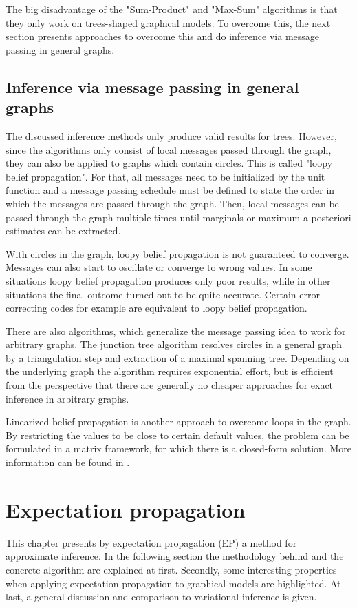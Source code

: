 \documentclass{sigkdd}
\begin{document}
The big disadvantage of the "Sum-Product" and "Max-Sum" algorithms is that they only work on trees-shaped graphical models. To overcome this, the next section presents approaches to overcome this and do inference via message passing in general graphs.

\subsection{Inference via message passing in general graphs}
The discussed inference methods only produce valid results for trees. However, since the algorithms only consist of local messages passed through the graph, they can also be applied to graphs which contain circles. This is called "loopy belief propagation". For that, all messages need to be initialized by the unit function and a message passing schedule must be defined to state the order in which the messages are passed through the graph. Then, local messages can be passed through the graph multiple times until marginals or maximum a posteriori estimates can be extracted.

With circles in the graph, loopy belief propagation is not guaranteed to converge. Messages can also start to oscillate or converge to wrong values. In some situations loopy belief propagation produces only poor results, while in other situations the final outcome turned out to be quite accurate. Certain error-correcting codes for example are equivalent to loopy belief propagation.

There are also algorithms, which generalize the message passing idea to work for arbitrary graphs. The junction tree algorithm resolves circles in a general graph by a triangulation step and extraction of a maximal spanning tree. Depending on the underlying graph the algorithm requires exponential effort, but is efficient from the perspective that there are generally no cheaper approaches for exact inference in arbitrary graphs.

Linearized belief propagation is another approach to overcome loops in the graph. By restricting the values to be close to certain default values, the problem can be formulated in a matrix framework, for which there is a closed-form solution. More information can be found in \cite{Gatterbauer:2015:LSB:2735479.2735490}. 

\section{Expectation propagation}\label{chapter:approximate_inference}
This chapter presents by expectation propagation (EP) a method for approximate inference. In the following section the methodology behind and the concrete algorithm are explained at first. Secondly, some interesting properties when applying expectation propagation to graphical models are highlighted. At last, a general discussion and comparison to variational inference is given.
\end{document}
